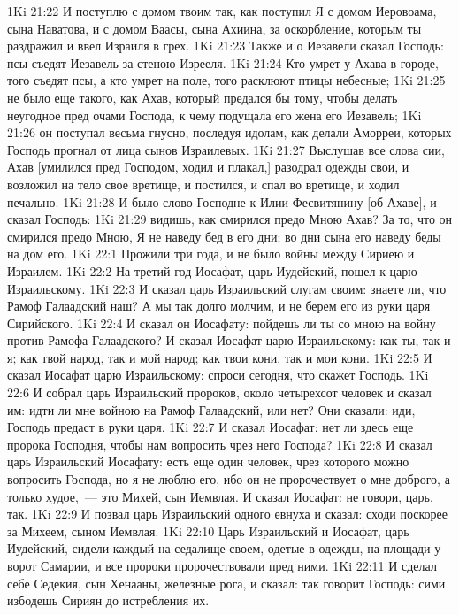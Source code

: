 \vs 1Ki 21:22 И поступлю с домом твоим так, как поступил Я с домом Иеровоама, сына Наватова, и с домом Ваасы, сына Ахиина, за оскорбление, которым ты раздражил  и ввел Израиля в грех.
\vs 1Ki 21:23 Также и о Иезавели сказал Господь: псы съедят Иезавель за стеною Изрееля.
\vs 1Ki 21:24 Кто умрет у Ахава в городе, того съедят псы, а кто умрет на поле, того расклюют птицы небесные;
\vs 1Ki 21:25 не было еще такого, как Ахав, который предался бы тому, чтобы делать неугодное пред очами Господа, к чему подущала его жена его Иезавель;
\vs 1Ki 21:26 он поступал весьма гнусно, последуя идолам, как делали Аморреи, которых Господь прогнал от лица сынов Израилевых.
\vs 1Ki 21:27 Выслушав все слова сии, Ахав [умилился пред Господом, ходил и плакал,] разодрал одежды свои, и возложил на тело свое вретище, и постился, и спал во вретище, и ходил печально.
\vs 1Ki 21:28 И было слово Господне к Илии Фесвитянину [об Ахаве], и сказал Господь:
\vs 1Ki 21:29 видишь, как смирился предо Мною Ахав? За то, что он смирился предо Мною, Я не наведу бед в его дни; во дни сына его наведу беды на дом его.
\vs 1Ki 22:1 Прожили три года, и не было войны между Сириею и Израилем.
\vs 1Ki 22:2 На третий год Иосафат, царь Иудейский, пошел к царю Израильскому.
\vs 1Ki 22:3 И сказал царь Израильский слугам своим: знаете ли, что Рамоф Галаадский наш? А мы так долго молчим, и не берем его из руки царя Сирийского.
\vs 1Ki 22:4 И сказал он Иосафату: пойдешь ли ты со мною на войну против Рамофа Галаадского? И сказал Иосафат царю Израильскому: как ты, так и я; как твой народ, так и мой народ; как твои кони, так и мои кони.
\vs 1Ki 22:5 И сказал Иосафат царю Израильскому: спроси сегодня, что скажет Господь.
\vs 1Ki 22:6 И собрал царь Израильский пророков, около четырехсот человек и сказал им: идти ли мне войною на Рамоф Галаадский, или нет? Они сказали: иди, Господь предаст  в руки царя.
\vs 1Ki 22:7 И сказал Иосафат: нет ли здесь еще пророка Господня, чтобы нам вопросить чрез него Господа?
\vs 1Ki 22:8 И сказал царь Израильский Иосафату: есть еще один человек, чрез которого можно вопросить Господа, но я не люблю его, ибо он не пророчествует о мне доброго, а только худое,~--- это Михей, сын Иемвлая. И сказал Иосафат: не говори, царь, так.
\vs 1Ki 22:9 И позвал царь Израильский одного евнуха и сказал: сходи поскорее за Михеем, сыном Иемвлая.
\vs 1Ki 22:10 Царь Израильский и Иосафат, царь Иудейский, сидели каждый на седалище своем, одетые в  одежды, на площади у ворот Самарии, и все пророки пророчествовали пред ними.
\vs 1Ki 22:11 И сделал себе Седекия, сын Хенааны, железные рога, и сказал: так говорит Господь: сими избодешь Сириян до истребления их.

